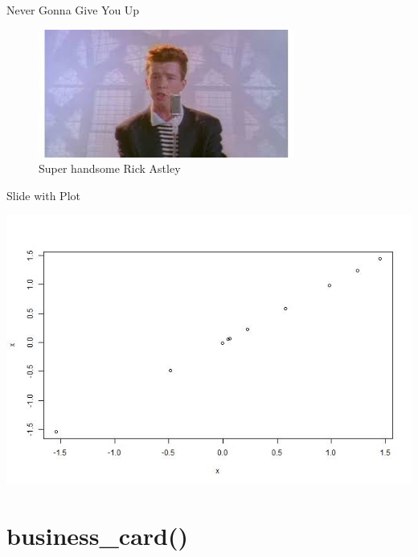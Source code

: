 \documentclass[ignorenonframetext,]{beamer}
\begin{document}
\begin{frame}{Never Gonna Give You Up}
\protect\hypertarget{never-gonna-give-you-up}{}

\begin{figure}
\centering
\includegraphics{foto.jpg}
\caption{Super handsome Rick Astley}
\end{figure}

\end{frame}

\begin{frame}{Slide with Plot}
\protect\hypertarget{slide-with-plot}{}

\scriptsize\includegraphics{prezentacja_pakietu_files/figure-beamer/unnamed-chunk-5-1.jpeg}

\end{frame}

\hypertarget{business_card}{%
\section{business\_card()}\label{business_card}}
\end{document}
